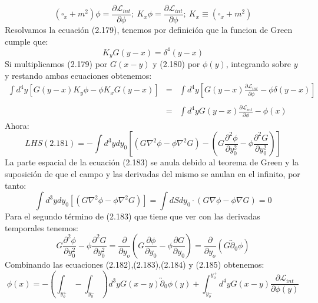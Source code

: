 \begin{equation}
(\square_{x}+m^{2})\phi=\frac{\partial\mathcal{L}_{int}}{\partial\phi};\ K_{x}\phi=\frac{\partial\mathcal{L}_{int}}{\partial\phi};\ K_{x}\equiv(\square_{x}+m^{2})
\end{equation}
Resolvamos la ecuación (2.179), tenemos por definición que la funcion de Green cumple que:
\begin{equation}
K_yG(y-x)=\delta^4(y-x)
\end{equation}
Si multiplicamos (2.179) por $G(x-y)$ y (2.180) por $\phi(y)$, integrando sobre $y$ y restando ambas ecuaciones obtenemos:
\begin{eqnarray}
\nonumber \int d^{4}y\left[G(y-x)K_{y}\phi-\phi K_{x}G(y-x)\right]&=&\int d^{4}y\left[G(y-x)\frac{\partial\mathcal{L}_{int}}{\partial\phi}-\phi\delta(y-x)\right]\\
&&\\
&=&\int d^{4}yG(y-x)\frac{\partial\mathcal{L}_{int}}{\partial\phi}-\phi(x)
\end{eqnarray}
Ahora:
\begin{equation}
LHS(2.181)=-\int d^{3}ydy_{0}\left[(G\nabla^{2}\phi-\phi\nabla^{2}G)-\left(G\frac{\partial^{2}\phi}{\partial y_{0}^{2}}-\phi\frac{\partial^{2}G}{\partial y_{0}^{2}}\right)\right]
\end{equation}
La parte espacial de la ecuación (2.183) se anula debido al teorema de Green y la suposición de que el campo y las derivadas del mismo se anulan en el infinito, por tanto:
\begin{equation}
\int d^{3}ydy_{0}\left[(G\nabla^{2}\phi-\phi\nabla^{2}G)\right]=\int dSdy_{0}\cdot(G\nabla\phi-\phi\nabla G)=0
\end{equation}
Para el segundo término de (2.183) que tiene que ver con las derivadas temporales tenemos:
\begin{equation}
G\frac{\partial^{2}\phi}{\partial y_{0}^{2}}-\phi\frac{\partial^{2}G}{\partial y_{0}^{2}}=\frac{\partial}{\partial y_{o}}\left(G\frac{\partial\phi}{\partial y_{0}}-\phi\frac{\partial G}{\partial y_{0}}\right)=\frac{\partial}{\partial y_{o}}\left(G\overleftrightarrow{\partial}_{0}\phi\right)
\end{equation}
Combinando las ecuaciones (2.182),(2.183),(2.184) y (2.185) obtenemos:
\begin{equation}
\phi(x)=-\left(\int_{y_{o}^{+}}-\int_{y_{0}^{-}}\right)d^{3}yG(x-y)\overleftrightarrow{\partial}_{0}\phi(y)+\int_{y_{o}^{-}}^{y_{o}^{+}}d^{4}yG(x-y)\frac{\partial\mathcal{L}_{int}}{\partial\phi(y)}
\end{equation}
